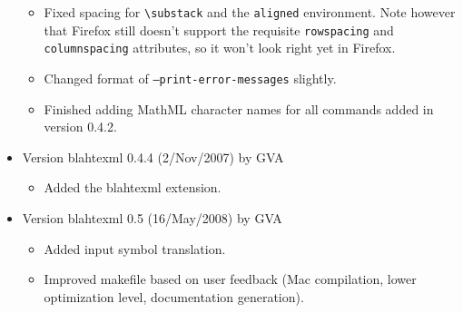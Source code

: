 \documentclass{article}
\newcommand{\texcommand}[1]{\textbackslash{}#1}
\begin{document}
\begin{itemize}
\begin{itemize}
\item Fixed spacing for \texttt{\texcommand{substack}} and the \texttt{aligned} environment. Note however that Firefox still doesn't support the requisite \texttt{rowspacing} and \texttt{columnspacing} attributes, so it won't look right yet in Firefox.
\item Changed format of \texttt{--print-error-messages} slightly.
\item Finished adding MathML character names for all commands added in version 0.4.2.
\end{itemize}
\item Version blahtexml 0.4.4 (2/Nov/2007) by GVA
\begin{itemize}
\item Added the blahtexml extension.
\end{itemize}
\item Version blahtexml 0.5 (16/May/2008) by GVA
\begin{itemize}
\item Added input symbol translation.
\item Improved makefile based on user feedback (Mac compilation, lower optimization level, documentation generation).
\end{itemize}
\end{itemize}
\end{document}
